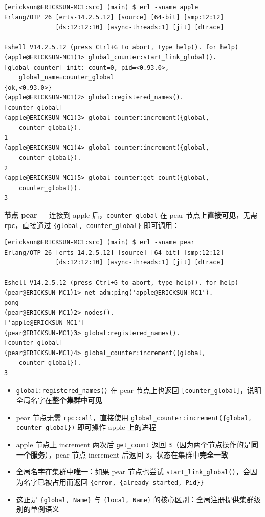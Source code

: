 \documentclass[a4paper,11pt]{article}
\begin{document}
\begin{lstlisting}[style=shellstyle, caption={apple 节点 --- 全局注册 counter\_global}]
[ericksun@ERICKSUN-MC1:src] (main) $ erl -sname apple
Erlang/OTP 26 [erts-14.2.5.12] [source] [64-bit] [smp:12:12]
              [ds:12:12:10] [async-threads:1] [jit] [dtrace]

Eshell V14.2.5.12 (press Ctrl+G to abort, type help(). for help)
(apple@ERICKSUN-MC1)1> global_counter:start_link_global().
[global_counter] init: count=0, pid=<0.93.0>,
    global_name=counter_global
{ok,<0.93.0>}
(apple@ERICKSUN-MC1)2> global:registered_names().
[counter_global]
(apple@ERICKSUN-MC1)3> global_counter:increment({global,
    counter_global}).
1
(apple@ERICKSUN-MC1)4> global_counter:increment({global,
    counter_global}).
2
(apple@ERICKSUN-MC1)5> global_counter:get_count({global,
    counter_global}).
3
\end{lstlisting}

\textbf{节点 pear} --- 连接到 apple 后，\texttt{counter\_global} 在 pear 节点上\textbf{直接可见}，无需 \texttt{rpc}，直接通过 \texttt{\{global, counter\_global\}} 即可调用：

\begin{lstlisting}[style=shellstyle, caption={pear 节点 --- 直接通过全局名字访问 apple 上的 counter\_global}]
[ericksun@ERICKSUN-MC1:src] (main) $ erl -sname pear
Erlang/OTP 26 [erts-14.2.5.12] [source] [64-bit] [smp:12:12]
              [ds:12:12:10] [async-threads:1] [jit] [dtrace]

Eshell V14.2.5.12 (press Ctrl+G to abort, type help(). for help)
(pear@ERICKSUN-MC1)1> net_adm:ping('apple@ERICKSUN-MC1').
pong
(pear@ERICKSUN-MC1)2> nodes().
['apple@ERICKSUN-MC1']
(pear@ERICKSUN-MC1)3> global:registered_names().
[counter_global]
(pear@ERICKSUN-MC1)4> global_counter:increment({global,
    counter_global}).
3
\end{lstlisting}

\begin{tipbox}[全局注册的关键特性]
\begin{itemize}[leftmargin=1.5em]
    \item \texttt{global:registered\_names()} 在 pear 节点上也返回 \texttt{[counter\_global]}，说明全局名字在\textbf{整个集群中可见}
    \item pear 节点无需 \texttt{rpc:call}，直接使用 \texttt{global\_counter:increment(\{global, counter\_global\})} 即可操作 apple 上的进程
    \item apple 节点上 increment 两次后 \texttt{get\_count} 返回 \texttt{3}（因为两个节点操作的是\textbf{同一个服务}），pear 节点 increment 后返回 \texttt{3}，状态在集群中\textbf{完全一致}
    \item 全局名字在集群中\textbf{唯一}：如果 pear 节点也尝试 \texttt{start\_link\_global()}，会因为名字已被占用而返回 \texttt{\{error, \{already\_started, Pid\}\}}
    \item 这正是 \texttt{\{global, Name\}} 与 \texttt{\{local, Name\}} 的核心区别：全局注册提供集群级别的单例语义
\end{itemize}
\end{tipbox}
\end{document}
